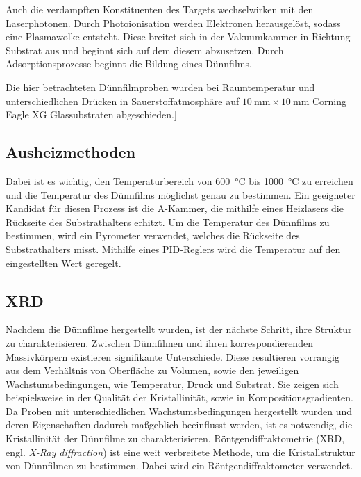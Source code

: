 Auch die verdampften Konstituenten des Targets wechselwirken mit den Laserphotonen.
Durch Photoionisation werden Elektronen herausgelöst, sodass eine Plasmawolke entsteht.
Diese breitet sich in der Vakuumkammer in Richtung Substrat aus und beginnt sich auf dem diesem abzusetzen.
Durch Adsorptionsprozesse beginnt die Bildung eines Dünnfilms.\autocite[2299-2301]{pld}

Die hier betrachteten Dünnfilmproben wurden bei Raumtemperatur und unterschiedlichen Drücken in Sauerstoffatmosphäre
auf $\qty{10}{\milli\meter} \times \qty{10}{\milli\meter}$  Corning Eagle XG Glassubstraten abgeschieden.]

\subsection{Ausheizmethoden}\label{subsec:ausheiz}

Dabei ist es wichtig, den Temperaturbereich von \qty{600}{\degreeCelsius} bis \qty{1000}{\degreeCelsius} zu erreichen
und die Temperatur des Dünnfilms möglichst genau zu bestimmen.
Ein geeigneter Kandidat für diesen Prozess ist die A-Kammer, die mithilfe eines Heizlasers die Rückseite des
Substrathalters erhitzt.
Um die Temperatur des Dünnfilms zu bestimmen, wird ein Pyrometer verwendet, welches die Rückseite des Substrathalters
misst.
Mithilfe eines PID-Reglers wird die Temperatur auf den eingestellten Wert geregelt.

\newpage

\subsection{XRD}\label{subsec:xrd}
Nachdem die Dünnfilme hergestellt wurden, ist der nächste Schritt, ihre Struktur zu charakterisieren.
Zwischen Dünnfilmen und ihren korrespondierenden Massivkörpern existieren signifikante Unterschiede.
Diese resultieren vorrangig aus dem Verhältnis von Oberfläche zu Volumen, sowie den jeweiligen
Wachstumsbedingungen, wie Temperatur, Druck und Substrat.
Sie zeigen sich beispielsweise in der Qualität der Kristallinität, sowie in Kompositionsgradienten.
Da Proben mit unterschiedlichen Wachstumsbedingungen hergestellt wurden und deren Eigenschaften dadurch
maßgeblich beeinflusst werden, ist es notwendig, die Kristallinität der Dünnfilme zu charakterisieren.
Röntgendiffraktometrie (XRD, engl. \textit{X-Ray diffraction}) ist eine weit verbreitete Methode, um die
Kristallstruktur von Dünnfilmen zu bestimmen.
Dabei wird ein Röntgendiffraktometer verwendet.


